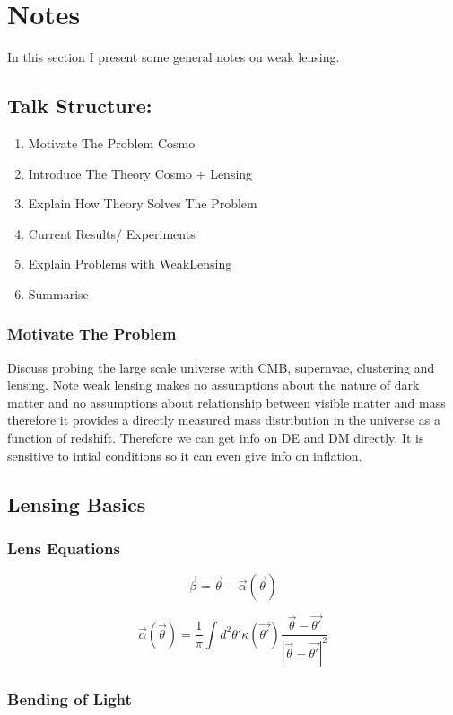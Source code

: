 \section{Notes}
In this section I present some general notes on weak lensing. 

\subsection{Talk Structure:}
\begin{enumerate}
    \item Motivate The Problem Cosmo
    \item Introduce The Theory Cosmo + Lensing
    \item Explain How Theory Solves The Problem
    \item Current Results/ Experiments
    \item Explain Problems with WeakLensing
    \item Summarise
\end{enumerate}

\subsubsection{Motivate The Problem}
Discuss probing the large scale universe with CMB, supernvae, clustering
and lensing. 
Note weak lensing makes no assumptions about the nature of dark matter
and no assumptions about relationship between visible matter and mass therefore
it provides a directly measured mass distribution in the universe as a function of 
redshift. Therefore we can get info on DE and DM directly. It is sensitive to intial
conditions so it can even give info on inflation. 

\subsection{Lensing Basics}
\subsubsection{Lens Equations}
\begin{equation}
    \vec{\beta} = \vec{\theta} - \vec{\alpha}(\vec{\theta})
\end{equation}

\begin{equation}
  \vec{\alpha}(\vec{\theta}) = \frac{1}{\pi}  \int d^2\theta'  \kappa(\vec{\theta'}) \frac{\vec{\theta}-\vec{\theta'}}{|\vec{\theta}-\vec{\theta'}|^2}
    \label{eq:}
\end{equation}


\subsubsection{Bending of Light}
